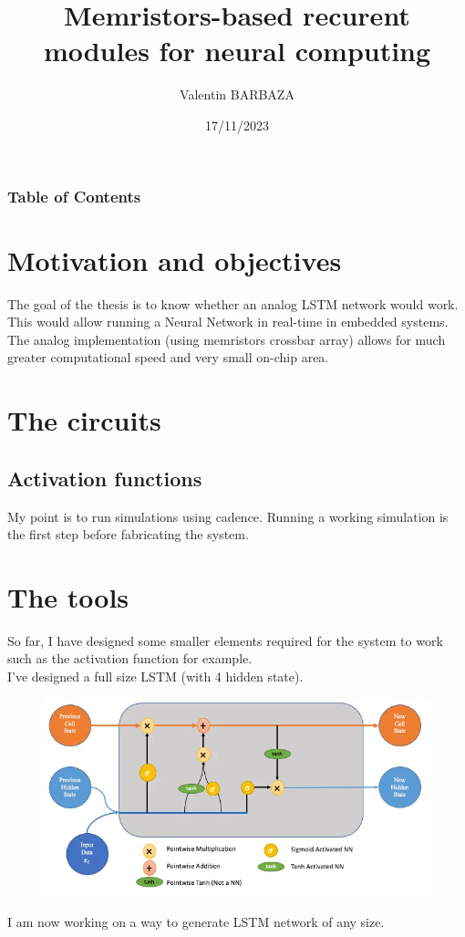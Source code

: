 \documentclass[table]{beamer}
\title{Memristors-based recurent modules for neural computing}
\subtitle{}
\author[V. BARBAZA]{{\large Valentin BARBAZA}}
\date{17/11/2023}
\begin{document}
  \frame{\titlepage}

  \begin{frame}
    \frametitle{Table of Contents}
    \tableofcontents
  \end{frame}

  \section{Motivation and objectives}
  \begin{frame}{\insertsection}{\insertsubsection}
    The goal of the thesis is to know whether an analog LSTM network would work. This would allow running a Neural Network in real-time in embedded systems. The analog implementation (using memristors crossbar array) allows for much greater computational speed and very small on-chip area.
  \end{frame}
  \section{The circuits}
  \subsection{Activation functions}
  \begin{frame}{\insertsection}{\insertsubsection}
    My point is to run simulations using cadence. Running a working simulation is the first step before fabricating the system.
  \end{frame}
  \section{The tools}
  \begin{frame}{\insertsection}{\insertsubsection}
    So far, I have designed some smaller elements required for the system to work such as the activation function for example.\\
    I've designed a full size LSTM (with 4 hidden state).
    \begin{figure}
      \centering
      \includegraphics[height=0.35\textheight]{lstm/lstm.png}
    \end{figure}
    I am now working on a way to generate LSTM network of any size.
  \end{frame}
\end{document}
